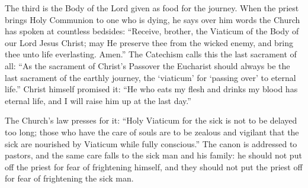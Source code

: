 The third is the Body of the Lord given as food for the journey. When the priest brings Holy Communion to one who is dying, he says over him words the Church has spoken at countless bedsides:  ``Receive, brother, the Viaticum of the Body of our Lord Jesus Christ; may He preserve thee from the wicked enemy, and bring thee unto life everlasting. Amen.'' The Catechism calls this the last sacrament of all: ``As the sacrament of Christ's Passover the Eucharist should always be the last sacrament of the earthly journey, the `viaticum' for `passing over' to eternal life.'' Christ himself promised it: ``He who eats my flesh and drinks my blood has eternal life, and I will raise him up at the last day.''

The Church's law presses for it: ``Holy Viaticum for the sick is not to be delayed too long; those who have the care of souls are to be zealous and vigilant that the sick are nourished by Viaticum while fully conscious.'' The canon is addressed to pastors, and the same care falls to the sick man and his family: he should not put off the priest for fear of frightening himself, and they should not put the priest off for fear of frightening the sick man.
